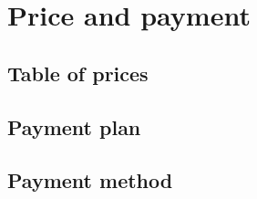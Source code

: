 \section{Price and payment}

\subsection{Table of prices}

\lipsum[2]

\subsection{Payment plan}

\lipsum[2]

\subsection{Payment method}

\lipsum[2]
